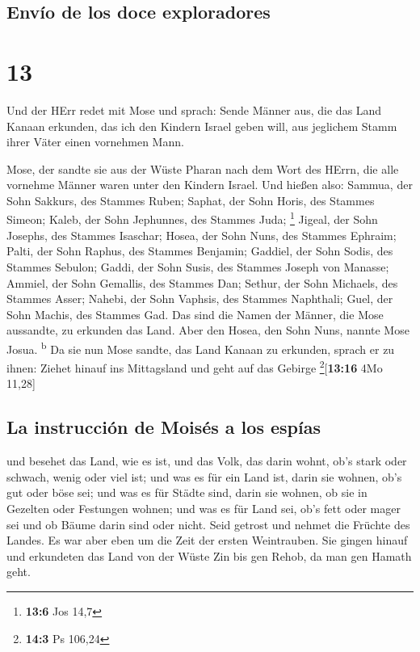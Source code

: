 \hypertarget{envuxedo-de-los-doce-exploradores}{%
\subsection{Envío de los doce
exploradores}\label{envuxedo-de-los-doce-exploradores}}

\hypertarget{section-12}{%
\section{13}\label{section-12}}

 Und der HErr redet mit Mose und sprach: 
Sende Männer aus, die das Land Kanaan erkunden, das ich den Kindern
Israel geben will, aus jeglichem Stamm ihrer Väter einen vornehmen Mann.

 Mose, der sandte sie aus der Wüste Pharan nach dem Wort
des HErrn, die alle vornehme Männer waren unter den Kindern Israel.
 Und hießen also: Sammua, der Sohn Sakkurs, des Stammes
Ruben;  Saphat, der Sohn Horis, des Stammes Simeon;
 Kaleb, der Sohn Jephunnes, des Stammes Juda; \footnote{\textbf{13:6}
  Jos 14,7}  Jigeal, der Sohn Josephs, des Stammes
Isaschar;  Hosea, der Sohn Nuns, des Stammes Ephraim;
 Palti, der Sohn Raphus, des Stammes Benjamin;
 Gaddiel, der Sohn Sodis, des Stammes Sebulon;
 Gaddi, der Sohn Susis, des Stammes Joseph von Manasse;
 Ammiel, der Sohn Gemallis, des Stammes Dan;
 Sethur, der Sohn Michaels, des Stammes Asser;
 Nahebi, der Sohn Vaphsis, des Stammes Naphthali;
 Guel, der Sohn Machis, des Stammes Gad. 
Das sind die Namen der Männer, die Mose aussandte, zu erkunden das Land.
Aber den Hosea, den Sohn Nuns, nannte Mose Josua. \textsuperscript{b}
 Da sie nun Mose sandte, das Land Kanaan zu erkunden,
sprach er zu ihnen: Ziehet hinauf ins Mittagsland und geht auf das
Gebirge \footnote{\textbf{14:3} Ps 106,24}{[}\textbf{13:16} 4Mo 11,28{]}

\hypertarget{la-instrucciuxf3n-de-moisuxe9s-a-los-espuxedas}{%
\subsection{La instrucción de Moisés a los
espías}\label{la-instrucciuxf3n-de-moisuxe9s-a-los-espuxedas}}

 und besehet das Land, wie es ist, und das Volk, das
darin wohnt, ob's stark oder schwach, wenig oder viel ist;
 und was es für ein Land ist, darin sie wohnen, ob's gut
oder böse sei; und was es für Städte sind, darin sie wohnen, ob sie in
Gezelten oder Festungen wohnen;  und was es für Land sei,
ob's fett oder mager sei und ob Bäume darin sind oder nicht. Seid
getrost und nehmet die Früchte des Landes. Es war aber eben um die Zeit
der ersten Weintrauben.  Sie gingen hinauf und erkundeten
das Land von der Wüste Zin bis gen Rehob, da man gen Hamath geht.

